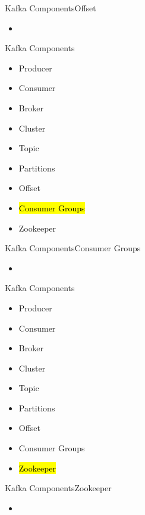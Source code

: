 \documentclass{beamer}
\begin{document}
\begin{frame}{Kafka Components}{Offset}
  \begin{itemize}
    \item
  \end{itemize}
\end{frame}

\begin{frame}{Kafka Components}
  \begin{itemize}
    \item Producer
    \item Consumer
    \item Broker
    \item Cluster
    \item Topic
    \item Partitions
    \item Offset
    \item \hl{Consumer Groups}
    \item Zookeeper
  \end{itemize}
\end{frame}

\begin{frame}{Kafka Components}{Consumer Groups}
  \begin{itemize}
    \item
  \end{itemize}
\end{frame}

\begin{frame}{Kafka Components}
  \begin{itemize}
    \item Producer
    \item Consumer
    \item Broker
    \item Cluster
    \item Topic
    \item Partitions
    \item Offset
    \item Consumer Groups
    \item \hl{Zookeeper}
  \end{itemize}
\end{frame}

\begin{frame}{Kafka Components}{Zookeeper}
  \begin{itemize}
    \item
  \end{itemize}
\end{frame}
\end{document}
